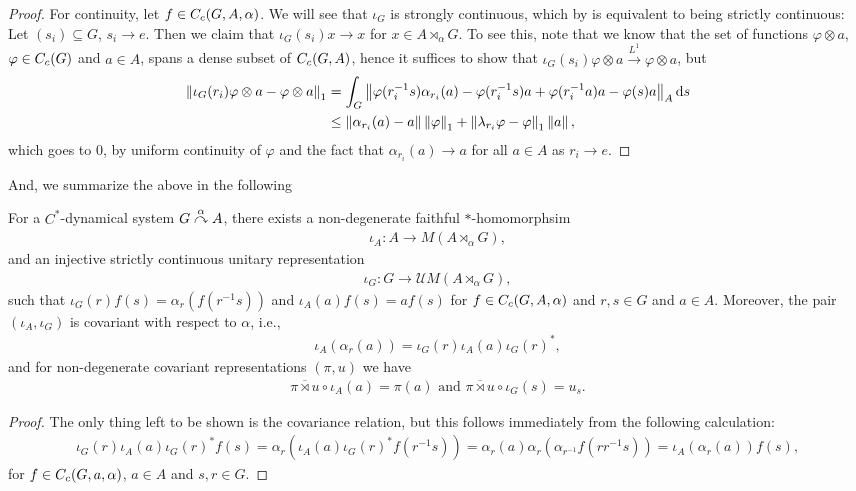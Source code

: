 \begin{proof}
For continuity, let $f \in C_c(G,A,\alpha)$. We will see that $\iota_G$ is strongly continuous, which by  is equivalent to being strictly continuous: Let $(s_i)\subseteq G$, $s_i \to e$. Then we claim that $\iota_G(s_i) x \to x$ for $x \in A \rtimes_\alpha G$. To see this, note that we know that the set of functions $\varphi \otimes a$, $\varphi \in C_c(G)$ and $a \in A$, spans a dense subset of $C_c(G,A)$, hence it suffices to show that $\iota_G(s_i) \varphi \otimes a \stackrel{L^1}{\to} \varphi \otimes a$, but
\begin{align*}
	\left\lVert \iota_G(r_{i}) \varphi \otimes a - \varphi \otimes a \right\rVert_1 &= \int_G \left\lVert \varphi(r_{i}^{-1}s) \alpha_{r_i}(a) - \varphi(r_i^{-1}s) a + \varphi(r_{i}^{-1}a) a - \varphi(s) a \right\rVert_A \mathrm{d} s\\ 
	& \leq \left\lVert \alpha_{r_i}(a) - a \right\rVert \left\lVert \varphi \right\rVert_1 + \left\lVert \lambda_{r_i} \varphi - \varphi \right\rVert_1 \left\lVert a \right\rVert,
\end{align*}
which goes to $0$, by uniform continuity of $\varphi$ and the fact that $\alpha_{r_i}(a) \to a$ for all $ a\in A$ as $r_i \to e$.
\end{proof}
And, we summarize the above in the following
\begin{proposition}
For a $C^*$-dynamical system $G \stackrel{\alpha}{\curvearrowright} A$, there exists a non-degenerate faithful $*$-homomorphsim 
\begin{align*}
\iota_A \colon A \to M(A \rtimes_\alpha G),	
\end{align*}
and an injective strictly continuous unitary representation 
\begin{align*}
	\iota_G \colon G \to \mathcal{U}M(A \rtimes_\alpha G),
\end{align*}
such that $\iota_G(r) f(s) = \alpha_r(f(r^{-1}s))$  and $\iota_A(a) f(s) = af(s)$ for $f \in C_c(G,A,\alpha)$ and $r,s \in G$ and $a \in A$. Moreover, the pair $(\iota_A,\iota_G)$ is covariant with respect to $\alpha$, i.e., 
\begin{align*}
	\iota_A(\alpha_r (a) ) = \iota_G(r)  \iota_A(a) \iota_G(r)^*,
\end{align*}
and for non-degenerate covariant representations $(\pi,u)$ we have
\begin{align*}
	\overline{\pi \rtimes u} \circ \iota_A(a) = \pi(a) \text{ and } \overline{\pi \rtimes u } \circ \iota_G (s) = u_s.
\end{align*}
\label{cross:iotaprop}
\end{proposition}
\begin{proof}
The only thing left to be shown is the covariance relation, but this follows immediately from the following calculation:
\begin{align*}
	\iota_G(r) \iota_A(a) \iota_G(r)^* f(s) = \alpha_r(\iota_A(a) \iota_G(r)^{*}f(r^{-1}s)) = \alpha_r(a) \alpha_r ( \alpha_{r^{-1}}f(r r^{-1}s))= \iota_A(\alpha_r(a)) f(s),
\end{align*}
for $f \in C_c(G,a,\alpha)$, $a \in A$ and $s,r \in G$.
\end{proof}
